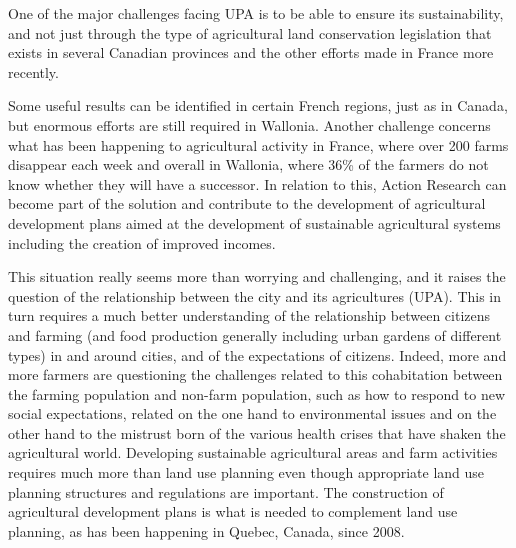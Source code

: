 \documentclass[10pt,a4paper]{article}
\begin{document}
\begin{multicols}{2}
One of the major challenges facing UPA is to be able to ensure its sustainability, and not just through the type of agricultural land conservation legislation that exists in several Canadian provinces and the other efforts made in France more recently.

Some useful results can be identified in certain French regions, just as in Canada, but enormous efforts are still required in Wallonia. Another challenge concerns what has been happening to agricultural activity in France, where over 200 farms disappear each week \citep{r15} and overall in Wallonia, where 36\% of the farmers do not know whether they will have a successor. In relation to this, Action Research can become part of the solution and contribute to the development of agricultural development plans aimed at the development of sustainable agricultural systems including the creation of improved incomes.

This situation really seems more than worrying and challenging, and it raises the question of the relationship between the city and its agricultures (UPA). This in turn requires a much better understanding of the relationship between citizens and farming (and food production generally including urban gardens of different types) in and around cities, and of the expectations of citizens. Indeed, more and more farmers are questioning the challenges related to this cohabitation between the farming population and non-farm population, such as how to respond to new social expectations, related on the one hand to environmental issues and on the other hand to the mistrust born of the various health crises that have shaken the agricultural world. Developing sustainable agricultural areas and farm activities requires much more than land use planning even though appropriate land use planning structures and regulations are important. The construction of agricultural development plans is what is needed to complement land use planning, as has been happening in Quebec, Canada, since 2008.


\end{multicols}
\end{document}

